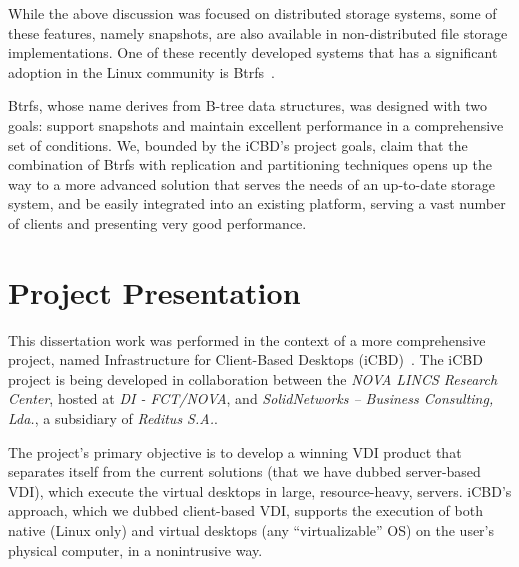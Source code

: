 While the above discussion was focused on distributed storage systems, some of these features, namely snapshots, are also available in non-distributed file storage implementations. One of these recently developed systems that has a significant adoption in the Linux community is Btrfs~\cite{Rodeh2013}.

Btrfs, whose name derives from B-tree data structures, was designed with two goals: support snapshots and maintain excellent performance in a comprehensive set of conditions. We, bounded by the iCBD’s project goals, claim that the combination of Btrfs with replication and partitioning techniques opens up the way to a more advanced solution that serves the needs of an up-to-date storage system, and be easily integrated into an existing platform, serving a vast number of clients and presenting very good performance.



\section{Project Presentation} %
\label{sec:intro_project_presentation}

This dissertation work was performed in the context of a more comprehensive project, named Infrastructure for Client-Based Desktops (iCBD)~\cite{Lopes2017}. The iCBD project is being developed in collaboration between the \textit{NOVA LINCS Research Center}, hosted at \textit{DI - FCT/NOVA}, and \textit{SolidNetworks – Business Consulting, Lda.}, a subsidiary of \textit{Reditus S.A.}.

The project’s primary objective is to develop a winning VDI product that separates itself from the current solutions (that we have dubbed server-based VDI), which execute the virtual desktops in large, resource-heavy, servers. iCBD’s approach, which we dubbed client-based VDI, supports the execution of both native (Linux only) and virtual desktops (any “virtualizable” OS) on the user’s physical computer, in a nonintrusive way.


